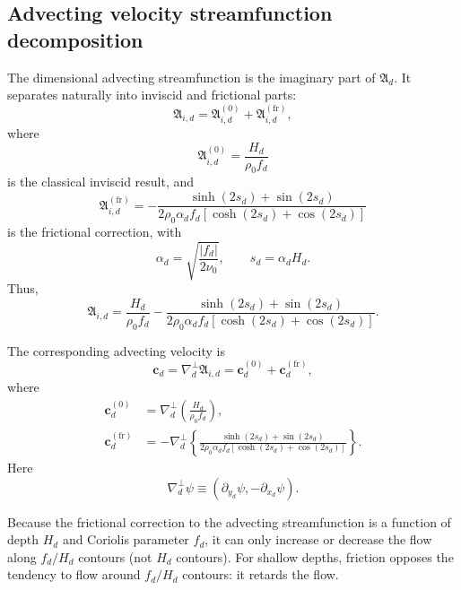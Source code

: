 \documentclass[10pt]{amsart}
\begin{document}
\subsection{Advecting velocity streamfunction decomposition}

The dimensional advecting streamfunction is the imaginary part of
\(\mathfrak A_d\). It separates naturally into inviscid and frictional
parts:
\begin{equation}
\mathfrak A_{i,d}
=
\mathfrak A_{i,d}^{(0)}
+
\mathfrak A_{i,d}^{(\mathrm{fr})},
\end{equation}
where
\begin{equation}
\boxed{
\mathfrak A_{i,d}^{(0)}
=
\frac{H_d}{\rho_0 f_d}
}
\end{equation}
is the classical inviscid result, and
\begin{equation}
\boxed{
\mathfrak A_{i,d}^{(\mathrm{fr})}
=
-
\frac{
\sinh(2s_d)+\sin(2s_d)
}{
2\rho_0\alpha_d f_d
\left[\cosh(2s_d)+\cos(2s_d)\right]
}
}
\end{equation}
is the frictional correction, with
\begin{equation}
\alpha_d
=
\sqrt{\frac{|f_d|}{2\nu_0}},
\qquad
s_d=\alpha_dH_d.
\end{equation}
Thus,
\begin{equation}
\boxed{
\mathfrak A_{i,d}
=
\frac{H_d}{\rho_0 f_d}
-
\frac{
\sinh(2s_d)+\sin(2s_d)
}{
2\rho_0\alpha_d f_d
\left[\cosh(2s_d)+\cos(2s_d)\right]
}
}.
\end{equation}

The corresponding advecting velocity is
\begin{equation}
\boldsymbol c_d
=
\nabla_d^\perp\mathfrak A_{i,d}
=
\boldsymbol c_d^{(0)}
+
\boldsymbol c_d^{(\mathrm{fr})},
\end{equation}
where
\begin{align}
\boldsymbol c_d^{(0)}
&=
\nabla_d^\perp
\left(
\frac{H_d}{\rho_0f_d}
\right),
\\
\boldsymbol c_d^{(\mathrm{fr})}
&=
-
\nabla_d^\perp
\left\{
\frac{
\sinh(2s_d)+\sin(2s_d)
}{
2\rho_0\alpha_d f_d
\left[\cosh(2s_d)+\cos(2s_d)\right]
}
\right\}.
\end{align}
Here
\begin{equation}
\nabla_d^\perp\psi
\equiv
\left(
\partial_{y_d}\psi,
-\partial_{x_d}\psi
\right).
\end{equation}

Because the frictional correction to the advecting streamfunction is a function of depth $H_d$ and Coriolis parameter $f_d$, it can only increase or decrease the flow along $f_d/H_d$ contours (not $H_d$ contours). 
For shallow depths, friction opposes the tendency to flow around $f_d/H_d$ contours: it retards the flow.
\end{document}
